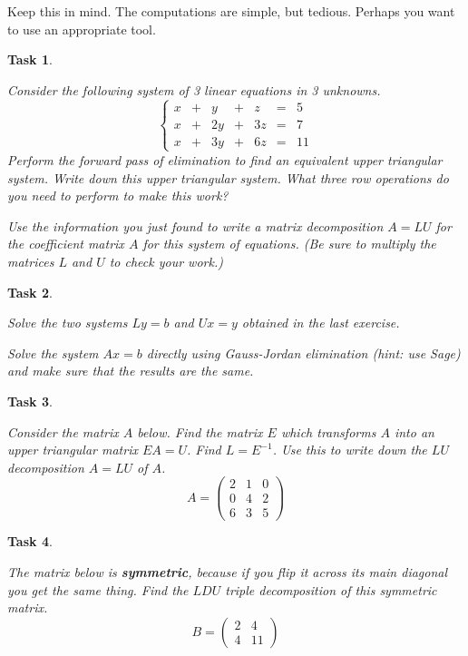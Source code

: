 \documentclass[10pt,]{book}
\newcommand{\terminology}[1]{\textbf{#1}}
\theoremstyle{plain}
\numberwithin{equation}{section}
\newtheorem{task}{Task}[chapter]
\begin{document}
    Keep this in mind. The computations are simple, but tedious.
    Perhaps you want to use an appropriate tool.
\begin{task}
\label{task-69}

        Consider the following system of 3 linear equations in 3 unknowns.
        \[\left\{
        \begin{array}{rrrrrrr}
        x & + & y & + & z & = & 5 \\
        x & + & 2y & + & 3z & = & 7 \\
        x & + & 3y & + & 6z & = & 11
        \end{array}\right.
        \]
        Perform the forward pass of elimination to find an equivalent upper
        triangular system. Write down this upper triangular system. What three
        row operations do you need to perform to make this work?
\par

        Use the information you just found to write a matrix
        decomposition \(A = LU\) for the coefficient matrix \(A\) for this
        system of equations. (Be sure to multiply the matrices \(L\) and \(U\)
        to check your work.)
\end{task}
\begin{task}
\label{task-70}

        Solve the two systems \(Ly = b\) and \(Ux=y\) obtained in the last
        exercise.
\par

        Solve the system \(Ax=b\) directly using Gauss-Jordan
        elimination (hint: use Sage) and make sure that the results
        are the same.
\end{task}
\begin{task}
\label{task-71}

      Consider the matrix \(A\) below. Find the matrix \(E\) which
      transforms \(A\) into an upper triangular matrix \(EA = U\).
      Find \(L = E^{-1}\). Use this to write down the \(LU\) decomposition
      \(A= LU\) of \(A\).
      \[
        A =
        \begin{pmatrix}
        2 & 1 & 0 \\
        0 & 4 & 2 \\
        6 & 3 & 5
        \end{pmatrix}
      \]\end{task}
\begin{task}
\label{task-72}

      The matrix below is \terminology{symmetric}, because if you flip it across
      its main diagonal you get the same thing. Find the \(LDU\) triple
      decomposition of this symmetric matrix.
      \[
        B =
        \begin{pmatrix}
        2 & 4 \\
        4 & 11
        \end{pmatrix}
      \]\end{task}
\end{document}

